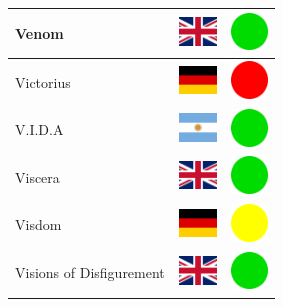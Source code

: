 \documentclass[12pt, a4paper, twoside]{report}
\begin{document}
\begin{center}
\begin{longtable}{|p{5cm}|p{2cm}|p{2cm}|}
Venom & \includegraphics[width=1cm]{4x3/gb} & \includegraphics[width=1cm]{likes/y} \\ \hline
Victorius & \includegraphics[width=1cm]{4x3/de} & \includegraphics[width=1cm]{likes/n} \\ \hline
V.I.D.A & \includegraphics[width=1cm]{4x3/ar} & \includegraphics[width=1cm]{likes/y} \\ \hline
Viscera & \includegraphics[width=1cm]{4x3/gb} & \includegraphics[width=1cm]{likes/y} \\ \hline
Visdom & \includegraphics[width=1cm]{4x3/de} & \includegraphics[width=1cm]{likes/m} \\ \hline
Visions of Disfigurement & \includegraphics[width=1cm]{4x3/gb} & \includegraphics[width=1cm]{likes/y} \\ \hline

\end{longtable}
\end{center}
\end{document}
